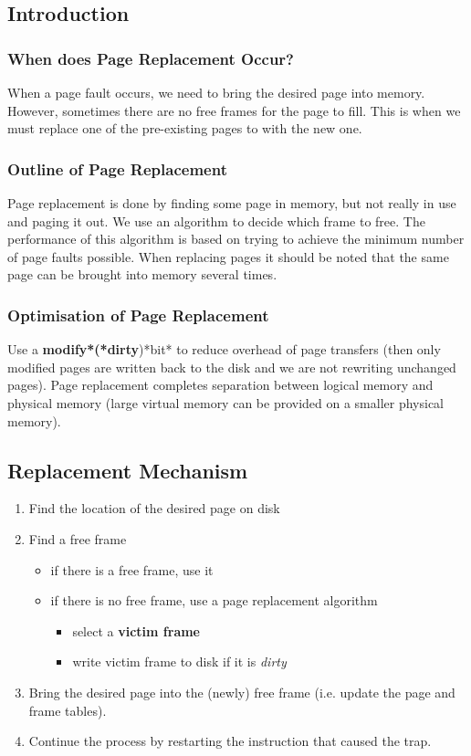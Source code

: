 \documentclass{article}%
\begin{document}
\subsection{Introduction}
\label{sec:org8b10a5a}
\subsubsection{When does Page Replacement Occur?}
\label{sec:org6425452}
When a page fault occurs, we need to bring the desired page into memory.
However, sometimes there are no free frames for the page to fill.
This is when we must replace one of the pre-existing pages to with the new one.

\subsubsection{Outline of Page Replacement}
\label{sec:org007ac98}
Page replacement is done by finding some page in memory, but not really in use and paging it out.
We use an algorithm to decide which frame to free.
The performance of this algorithm is based on trying to achieve the minimum number of page faults possible.
When replacing pages it should be noted that the same page can be brought into memory several times.

\subsubsection{Optimisation of Page Replacement}
\label{sec:orgbc35d25}
Use a \textbf{modify*(*dirty})*bit* to reduce overhead of page transfers (then only modified pages are written back to the disk and we are not rewriting unchanged pages).
Page replacement completes separation between logical memory and physical memory (large virtual memory can be provided on a smaller physical memory).

\subsection{Replacement Mechanism}
\label{sec:org55917b5}
\begin{enumerate}
\item Find the location of the desired page on disk
\item Find a free frame
\begin{itemize}
\item if there is a free frame, use it
\item if there is no free frame, use a page replacement algorithm
\begin{itemize}
\item select a \textbf{victim frame}
\item write victim frame to disk if it is \emph{dirty}
\end{itemize}
\end{itemize}
\item Bring the desired page into the (newly) free frame (i.e. update the page and frame tables).
\item Continue the process by restarting the instruction that caused the trap.
\end{enumerate}
\end{document}
